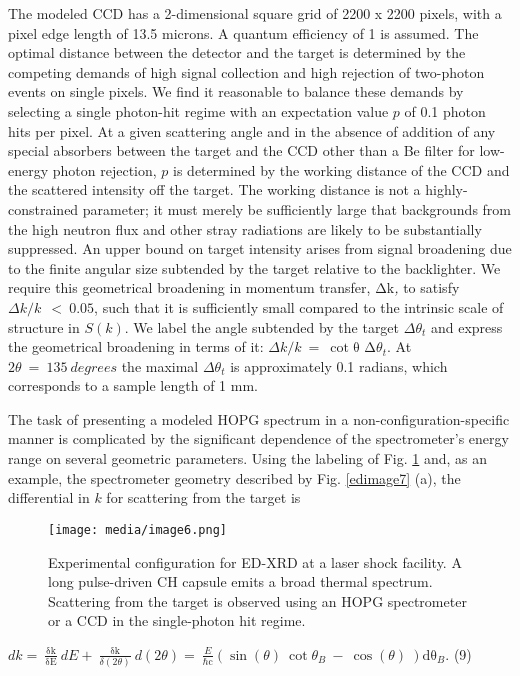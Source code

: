 The modeled CCD has a 2-dimensional square grid of 2200 x 2200 pixels,
with a pixel edge length of 13.5 microns. A quantum efficiency of 1 is
assumed. The optimal distance between the detector and the target is
determined by the competing demands of high signal collection and high
rejection of two-photon events on single pixels. We find it reasonable
to balance these demands by selecting a single photon-hit regime with an
expectation value \(p\) of 0.1 photon hits per pixel. At a given
scattering angle and in the absence of addition of any special absorbers
between the target and the CCD other than a Be filter for low-energy
photon rejection, \(p\) is determined by the working distance of the CCD
and the scattered intensity off the target. The working distance is not
a highly-constrained parameter; it must merely be sufficiently large
that backgrounds from the high neutron flux and other stray radiations
are likely to be substantially suppressed. An upper bound on target
intensity arises from signal broadening due to the finite angular size
subtended by the target relative to the backlighter. We require this
geometrical broadening in momentum transfer, \(\text{Δk}\)\emph{,} to
satisfy \(\Delta k/k\ \  < \ 0.05\), such that it is sufficiently small
compared to the intrinsic scale of structure in \(S(k)\). We label the
angle subtended by the target \(\Delta\theta_{t}\) and express the
geometrical broadening in terms of it:
\(\Delta k/k\  = \ \cot{\text{θ\ Δ}\theta_{t}}.\) At
\(2\theta\  = \ 135\ degrees\) the maximal \(\Delta\theta_{t}\) is
approximately 0.1 radians, which corresponds to a sample length of 1 mm.

The task of presenting a modeled HOPG spectrum in a
non-configuration-specific manner is complicated by the significant
dependence of the spectrometer's energy range on several geometric
parameters. Using the labeling of Fig. \ref{edimage6} and, as an example, the
spectrometer geometry described by Fig. \ref{edimage7} (a), the differential in \(k\)
for scattering from the target is

\begin{figure}[h] 
\caption{ Experimental configuration
for ED-XRD at a laser shock facility. A long pulse-driven CH capsule
emits a broad thermal spectrum. Scattering from the target is observed
using an HOPG spectrometer or a CCD in the single-photon hit regime.}
\label{edimage6}
\centering
\texttt{[image: media/image6.png]}
\end{figure}

\(dk = \ \frac{\text{δk}}{\text{δE}}\ dE + \ \frac{\text{δk}}{\delta(2\theta)}\ d(2\theta) = \ \frac{E}{\text{ℏc}}\left( \sin{(\theta)\ \cot{\theta_{B}\  - \ \cos{(\theta)}}}\  \right)\text{dθ}_{B}\).
(9)

